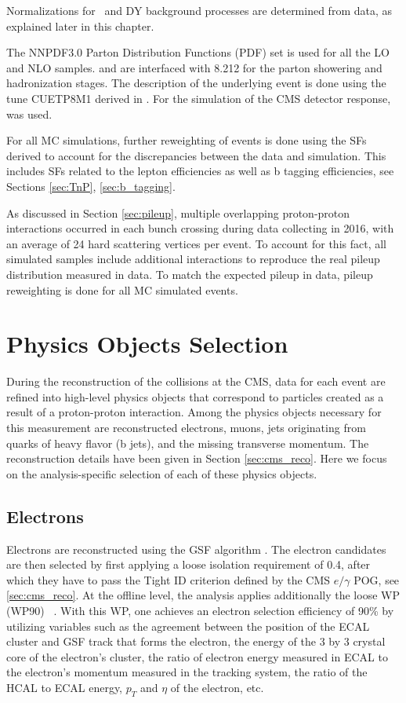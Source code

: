 Normalizations for \ttbar ~and DY background processes are determined from data, as explained later in this chapter.

The NNPDF3.0 \cite{Ball:2014uwa} Parton Distribution Functions
(PDF) set is used for all the LO and NLO samples. {\POWHEG} and {\MGMCatNLO} are interfaced with
{\PYTHIA}8.212 for the parton
showering and hadronization stages. The description of the underlying event is done using the tune CUETP8M1 derived in \cite{Khachatryan:2015pea}. For the simulation of the CMS detector response, \GEANTfour~\cite{GEANT4} was used. 

For all MC simulations, further reweighting of events is done using the SFs derived to account for the discrepancies between the data and simulation. This includes SFs related to the lepton efficiencies as well as b tagging efficiencies, see Sections \ref{sec:TnP}, \ref{sec:b_tagging}.

As discussed in Section \ref{sec:pileup}, multiple overlapping proton-proton interactions occurred in each bunch crossing during data collecting in 2016, with an average of 24 hard scattering vertices per event. To account for this fact, all simulated samples include additional interactions to reproduce the real pileup distribution measured in data. To match the expected pileup in data, pileup reweighting is done for all MC simulated events.

\section{Physics Objects Selection}
\label{sec:objects}


During the reconstruction of the collisions at the CMS, data for each event are refined into high-level physics objects that correspond to particles created as a result of a proton-proton interaction. Among the physics objects necessary for this measurement are reconstructed electrons, muons, jets originating from quarks of heavy flavor (b jets), and the missing transverse momentum. The reconstruction details have been given in Section \ref{sec:cms_reco}. Here we focus on the analysis-specific selection of each of these physics objects.

\subsection{Electrons}\label{sec:electrons}
Electrons are reconstructed using the GSF algorithm \cite{GSF}. The electron candidates are then selected by first applying a loose isolation requirement of 0.4, after which they have to pass the Tight ID criterion defined by the CMS $e/\gamma$ POG, see \ref{sec:cms_reco}. At the offline level, the analysis applies additionally the loose WP (WP90) ~\cite{vhbbAN}. With this WP, one achieves an electron selection efficiency of 90\% by utilizing variables such as the agreement between the position of the ECAL cluster and GSF track that forms the electron, the energy of the 3 by 3 crystal core of the electron's cluster, the ratio of electron energy measured in ECAL to the electron's momentum measured in the tracking system, the ratio of the HCAL to ECAL energy, $p_T$ and $\eta$ of the electron, etc.
